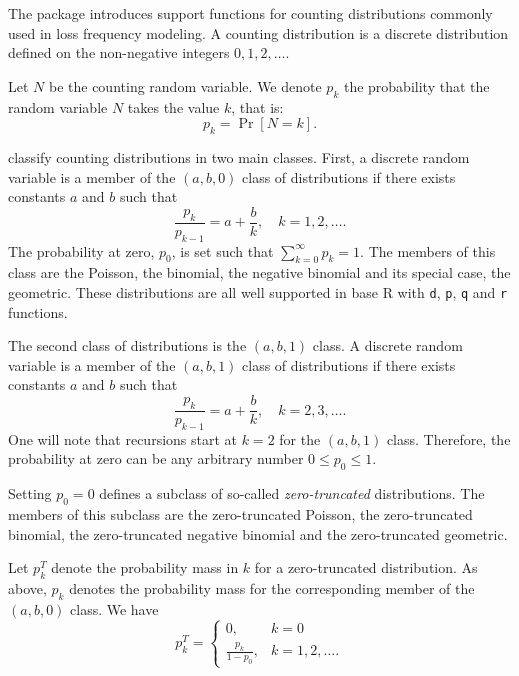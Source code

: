 \documentclass[x11names]{article}
\newcommand{\proglang}[1]{\textsf{#1}}
\newcommand{\code}[1]{\texttt{#1}}
\begin{document}
The package introduces support functions for counting distributions
commonly used in loss frequency modeling. A counting distribution is a
discrete distribution defined on the non-negative integers
$0, 1, 2, \dots$.

Let $N$ be the counting random variable. We denote $p_k$ the
probability that the random variable $N$ takes the value $k$, that is:
\begin{equation*}
  p_k = \Pr[N = k].
\end{equation*}

\citet{LossModels4e} classify counting distributions in two main
classes. First, a discrete random variable is a member of the
$(a, b, 0)$ class of distributions if there exists constants $a$ and
$b$ such that
\begin{equation*}
  \frac{p_k}{p_{k - 1}} = a + \frac{b}{k}, \quad k = 1, 2, \dots.
\end{equation*}
The probability at zero, $p_0$, is set such that
$\sum_{k = 0}^\infty p_k = 1$. The members of this class are the
Poisson, the binomial, the negative binomial and its special case, the
geometric. These distributions are all well supported in base
\proglang{R} with \code{d}, \code{p}, \code{q} and \code{r} functions.

The second class of distributions is the $(a, b, 1)$ class. A discrete
random variable is a member of the $(a, b, 1)$ class of distributions
if there exists constants $a$ and $b$ such that
\begin{equation*}
  \frac{p_k}{p_{k - 1}} = a + \frac{b}{k}, \quad k = 2, 3, \dots.
\end{equation*}
One will note that recursions start at $k = 2$ for the $(a, b, 1)$
class. Therefore, the probability at zero can be any arbitrary number
$0 \leq p_0 \leq 1$.

Setting $p_0 = 0$ defines a subclass of so-called
\emph{zero-truncated} distributions. The members of this subclass are
the zero-truncated Poisson, the zero-truncated binomial, the
zero-truncated negative binomial and the zero-truncated geometric.

Let $p_k^T$ denote the probability mass in $k$ for a zero-truncated
distribution. As above, $p_k$ denotes the probability mass for the
corresponding member of the $(a, b, 0)$ class. We have
\begin{equation*}
  p_k^T =
  \begin{cases}
    0, & k = 0 \\
    \frac{p_k}{1 - p_0}, & k = 1, 2, \dots.
  \end{cases}
\end{equation*}
\end{document}

